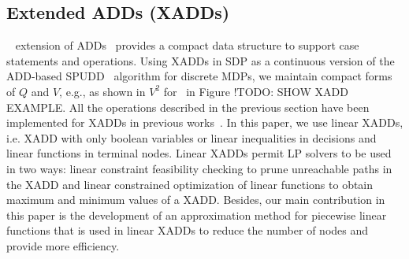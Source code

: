 \subsection {\bf Extended ADDs (XADDs)}
~\cite{sanner_uai11} extension of
ADDs~\cite{bahar93add} provides a compact data structure to support
case statements and operations.  Using XADDs in SDP as a continuous
version of the ADD-based SPUDD~\cite{spudd} algorithm for
discrete MDPs, we maintain compact forms of $Q$ and $V$, e.g., as
shown in $V^2$ for \MarsRover\ in Figure !TODO: SHOW XADD EXAMPLE.  All the operations described in the previous section have been implemented for XADDs in previous works~\cite{sanner_uai11}. In this paper, we use linear XADDs, i.e. XADD with only boolean variables or linear inequalities in decisions and linear functions in terminal nodes. Linear XADDs permit LP solvers to be used in two ways: linear constraint feasibility checking to prune unreachable paths in the XADD and linear constrained optimization of linear functions to obtain maximum and minimum values of a XADD. Besides, our main contribution in this paper is the development of an approximation method for piecewise linear functions that is used in linear XADDs to reduce the number of nodes and provide more efficiency.